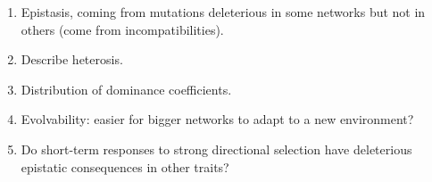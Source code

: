 \documentclass[11 pt]{article}
\begin{document}
\begin{enumerate}

    \item Epistasis, coming from mutations deleterious in some networks but not in others
(come from incompatibilities).

    \item Describe heterosis.

    \item Distribution of dominance coefficients.

    \item Evolvability: easier for bigger networks to adapt to a new environment?

    \item Do short-term responses to strong directional selection have deleterious epistatic consequences in other traits?

\end{enumerate}



\end{document}
